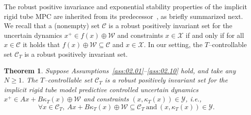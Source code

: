 \documentclass[twocolumn]{autart}
\newtheorem{theorem}{Theorem}
\newcommand{\mc}[1]{\mathcal{#1}}
\numberwithin{equation}{section}
\begin{document}
The robust positive invariance and exponential stability properties of the implicit rigid tube MPC are inherited from its predecessor~\cite{mayne:seron:rakovic:2005}, as briefly summarized next.  We recall that a (nonempty) set $\mc{C}$ is a robust positively invariant set for the uncertain dynamics $x^+\in f(x)\oplus \mc{W}$ and constraints $x\in\mc{X}$ if and only if for all $x\in\mc{C}$ it holds that $f(x)\oplus \mc{W}\subseteq \mc{C}$ and $x\in\mc{X}$. In our setting, the $T$--controllable set $\mc{C}_T$ is a robust positively invariant set. 
\begin{theorem}
\label{thm:04.02}
Suppose Assumptions~\ref{ass:02.01}--\ref{ass:02.10} hold, and take any $N\ge 1$. The $T$--controllable set $\mc{C}_T$ is a robust positively invariant set for the implicit rigid tube model predictive controlled uncertain dynamics  $x^+\in Ax+B\kappa_T(x)\oplus \mc{W}$ and constraints $(x,\kappa_T(x))\in\mc{Y}$, i.e.,
\begin{equation*}
\forall x\in\mc{C}_T,\  Ax+B\kappa_T(x)\oplus \mc{W}\subseteq \mc{C}_T\  \text{and}\  (x,\kappa_T(x))\in\mc{Y}.
\end{equation*}
\end{theorem}
\end{document}
